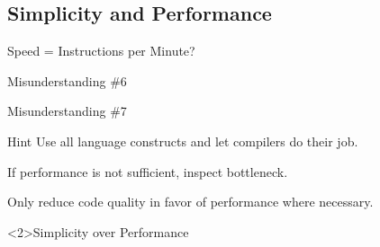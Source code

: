 \subsection{Simplicity and Performance}
\begin{frame}{Speed = Instructions per Minute?}
	\begin{fancycolumns}
		\begin{example}{Misunderstanding \#6}
		\end{example}
		
		\begin{example}{Misunderstanding \#7}
		\end{example}
		\nextcolumn
		\begin{note}{Hint}
			Use all language constructs and let compilers do their job.
			
			If performance is not sufficient, inspect bottleneck.
			
			Only reduce code quality in favor of performance where necessary.
		\end{note}
	\end{fancycolumns}
\end{frame}

\begin{frame}<2>{Simplicity over Performance}
	\slideSimplicityOverPerformance
\end{frame}
